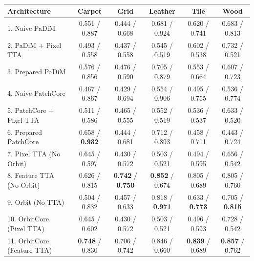 \documentclass{article}
\begin{document}
\begin{table}[t]
		\begin{tabular}{@{} l ccccc @{}}
			\toprule
			\textbf{Architecture} & \textbf{Carpet} & \textbf{Grid} & \textbf{Leather} & \textbf{Tile} & \textbf{Wood} \\
			\midrule
			1. Naive PaDiM & 0.551 / 0.887 & 0.444 / 0.668 & 0.681 / 0.924 & 0.620 / 0.741 & 0.683 / 0.813 \\
			2. PaDiM + Pixel TTA & 0.493 / 0.558 & 0.437 / 0.558 & 0.545 / 0.519 & 0.602 / 0.538 & 0.732 / 0.521 \\
			3. Prepared PaDiM & 0.576 / 0.856 & 0.476 / 0.590 & 0.705 / 0.879 & 0.553 / 0.664 & 0.607 / 0.723 \\
			4. Naive PatchCore & 0.467 / 0.867 & 0.429 / 0.694 & 0.554 / 0.906 & 0.495 / 0.755 & 0.536 / 0.774 \\
			5. PatchCore + Pixel TTA & 0.511 / 0.586 & 0.465 / 0.555 & 0.552 / 0.519 & 0.536 / 0.537 & 0.633 / 0.520 \\
			6. Prepared PatchCore & 0.658 / \textbf{0.932} & 0.444 / 0.681 & 0.712 / 0.893 & 0.458 / 0.711 & 0.443 / 0.724 \\
			7. Pixel TTA (No Orbit) & 0.645 / 0.597 & 0.430 / 0.572 & 0.503 / 0.521 & 0.494 / 0.595 & 0.656 / 0.542 \\
			8. Feature TTA (No Orbit) & 0.626 / 0.815 & \textbf{0.742} / \textbf{0.750} & \textbf{0.852} / 0.674 & 0.805 / 0.689 & 0.805 / 0.760 \\
			9. Orbit (No TTA) & 0.504 / 0.832 & 0.457 / 0.633 & 0.818 / \textbf{0.971} & 0.633 / \textbf{0.773} & 0.705 / \textbf{0.815} \\
			10. OrbitCore (Pixel TTA) & 0.645 / 0.602 & 0.430 / 0.572 & 0.503 / 0.521 & 0.496 / 0.593 & 0.728 / 0.542 \\
			11. OrbitCore (Feature TTA)& \textbf{0.748} / 0.830 & 0.706 / 0.742 & 0.846 / 0.660 & \textbf{0.839} / 0.689 & \textbf{0.857} / 0.762 \\
			\bottomrule
		\end{tabular}
	\end{table}
	
\end{document}
